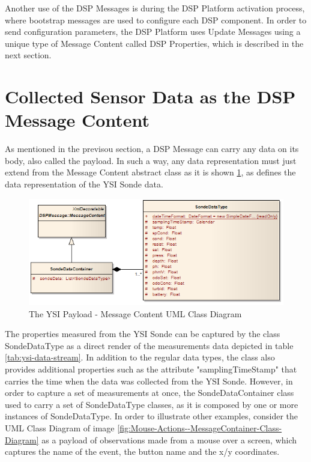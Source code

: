 Another use of the DSP Messages is during the DSP Platform activation process,
where bootstrap messages are used to configure each DSP component. In order to
send configuration parameters, the DSP Platform uses Update Messages using a
unique type of Message Content called DSP Properties, which is described in the
next section.

\section{Collected Sensor Data as the DSP Message Content}

As mentioned in the previsou section, a DSP Message can carry any data on its
body, also called the payload. In such a way, any data representation must
just extend from the Message Content abstract class as it is shown
\ref{fig:Sonde-MessageContainer-Class-Diagram}, as defines the data
representation of the YSI Sonde data.

\begin{figure}[!h]
  \centering
  \includegraphics[scale=0.6]{../diagrams/Sonde-MessageContainer-Class-Diagram}
  \caption{The YSI Payload - Message Content UML Class Diagram}
  \label{fig:Sonde-MessageContainer-Class-Diagram}
\end{figure}

The properties measured from the YSI Sonde can be captured by the class
SondeDataType as a direct render of the measurements data depicted in table
\ref{tab:ysi-data-stream}. In addition to the regular data types, the class
also provides additional properties such as the attribute "samplingTimeStamp"
that carries the time when the data was collected from the YSI Sonde. However,
in order to capture a set of measurements at once, the SondeDataContainer
class used to carry a set of SondeDataType classes, as it is composed by one
or more instances of SondeDataType. In order to illustrate other examples,
consider the UML Class Diagram \cite{uml} of image
\ref{fig:Mouse-Actions--MessageContainer-Class-Diagram} as a payload of
observations made from a mouse over a screen, which captures the name of the
event, the button name and the x/y coordinates.

